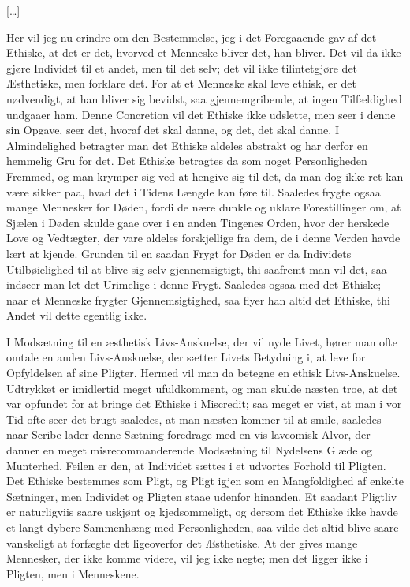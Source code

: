 \documentclass[12pt,a4paper]{article}
\begin{document}
[…]

Her vil jeg nu erindre om den Bestemmelse, jeg i det Foregaaende gav af det Ethiske, at det er det, hvorved et Menneske bliver det, han bliver. Det vil da ikke gjøre Individet til et andet, men til det selv; det vil ikke tilintetgjøre det Æsthetiske, men forklare det. For at et Menneske skal leve ethisk, er det nødvendigt, at han bliver sig bevidst, saa gjennemgribende, at ingen Tilfældighed undgaaer ham. Denne Concretion vil det Ethiske ikke udslette, men seer i denne sin Opgave, seer det, hvoraf det skal danne, og det, det skal danne. I Almindelighed betragter man det Ethiske aldeles abstrakt og har derfor en hemmelig Gru for det. Det Ethiske betragtes da som noget Personligheden Fremmed, og man krymper sig ved at hengive sig til det, da man dog ikke ret kan være sikker paa, hvad det i Tidens Længde kan føre til. Saaledes frygte ogsaa mange Mennesker for Døden, fordi de nære dunkle og uklare Forestillinger om, at Sjælen i Døden skulde gaae over i en anden Tingenes Orden, hvor der herskede Love og Vedtægter, der vare aldeles forskjellige fra dem, de i denne Verden havde lært at kjende. Grunden til en saadan Frygt for Døden er da Individets Utilbøielighed til at blive sig selv gjennemsigtigt, thi saafremt man vil det, saa indseer man let det Urimelige i denne Frygt. Saaledes ogsaa med det Ethiske; naar et Menneske frygter Gjennemsigtighed, saa flyer han altid det Ethiske, thi Andet vil dette egentlig ikke.

I Modsætning til en æsthetisk Livs-Anskuelse, der vil nyde Livet, hører man ofte omtale en anden Livs-Anskuelse, der sætter Livets Betydning i, at leve for Opfyldelsen af sine Pligter. Hermed vil man da betegne en ethisk Livs-Anskuelse. Udtrykket er imidlertid meget ufuldkomment, og man skulde næsten troe, at det var opfundet for at bringe det Ethiske i Miscredit; saa meget er vist, at man i vor Tid ofte seer det brugt saaledes, at man næsten kommer til at smile, saaledes naar Scribe lader denne Sætning foredrage med en vis lavcomisk Alvor, der danner en meget misrecommanderende Modsætning til Nydelsens Glæde og Munterhed. Feilen er den, at Individet sættes i et udvortes Forhold til Pligten. Det Ethiske bestemmes som Pligt, og Pligt igjen som en Mangfoldighed af enkelte Sætninger, men Individet og Pligten staae udenfor hinanden. Et saadant Pligtliv er naturligviis saare uskjønt og kjedsommeligt, og dersom det Ethiske ikke havde et langt dybere Sammenhæng med Personligheden, saa vilde det altid blive saare vanskeligt at forfægte det ligeoverfor det Æsthetiske. At der gives mange Mennesker, der ikke komme videre, vil jeg ikke negte; men det ligger ikke i Pligten, men i Menneskene.
\end{document}
